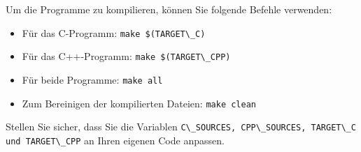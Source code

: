 \documentclass[12pt,a4paper]{scrartcl}
\newcommand{\tightlist}{
  \setlength{\itemsep}{0pt}\setlength{\parskip}{0pt}
}
\begin{document}
Um die Programme zu kompilieren, können Sie folgende Befehle verwenden:

\begin{itemize}
\tightlist
\item
  Für das C-Programm: {\lstinline!make $(TARGET\_C)!}
\item
  Für das C++-Programm: {\lstinline!make $(TARGET\_CPP)!}
\item
  Für beide Programme: {\lstinline!make all!}
\item
  Zum Bereinigen der kompilierten Dateien:
  {\lstinline!make clean!}
\end{itemize}

Stellen Sie sicher, dass Sie die Variablen
{\lstinline!C\_SOURCES, CPP\_SOURCES, TARGET\_C und TARGET\_CPP!}
an Ihren eigenen Code anpassen. %
\end{document}
